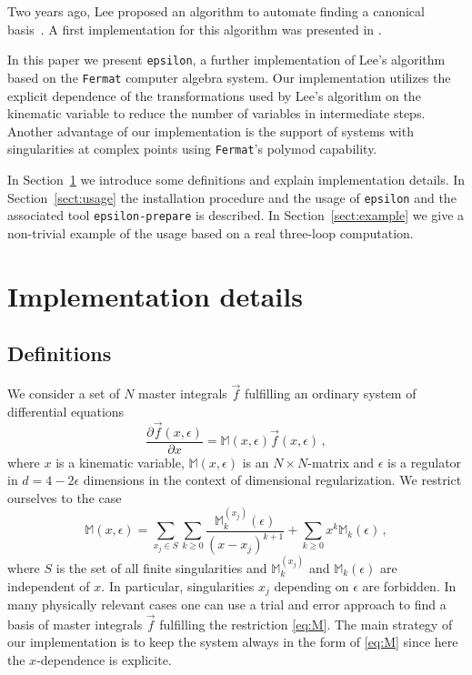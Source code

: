 \documentclass[12pt]{article}
\numberwithin{equation}{section}
\numberwithin{figure}{section}
\newcommand{\M}{\mathds{M}}
\begin{document}
    Two years ago, Lee proposed an algorithm to automate finding a canonical basis~\cite{Lee:2014ioa}.
    A first implementation for this algorithm was presented in \cite{Gituliar:2016vfa}.

    In this paper we present \texttt{epsilon}, a further implementation of Lee's algorithm based on the \texttt{Fermat}\cite{Lewis:fermat} computer algebra system.
    Our implementation utilizes the explicit dependence of the transformations used by Lee's algorithm on the kinematic variable to reduce the number of variables in intermediate steps.
    Another advantage of our implementation is the support of systems with singularities at complex points using \texttt{Fermat}'s polymod capability.

    In Section~\ref{sect:impl} we introduce some definitions and explain implementation details.
    In Section~\ref{sect:usage} the installation procedure and the usage of \texttt{epsilon} and the associated tool \texttt{epsilon-prepare} is described.
    In Section~\ref{sect:example} we give a non-trivial example of the usage based on a real three-loop computation.
  \section{Implementation details} \label{sect:impl}
    \subsection{Definitions}
      We consider a set of $N$ master integrals $\vec{f}$ fulfilling an ordinary system of differential equations
      \begin{equation} \label{eq:system}
        \frac{\partial \vec{f}(x,\epsilon)}{\partial x} 
        = 
        \M(x,\epsilon) \vec{f}(x,\epsilon)\,,
      \end{equation}
      where $x$ is a kinematic variable, $\M(x,\epsilon)$ is an $N\times N$-matrix and $\epsilon$ is a regulator in $d = 4-2\epsilon$ dimensions in the context of dimensional regularization.
      We restrict ourselves to the case
      \begin{equation} \label{eq:M}
        \M(x,\epsilon) 
        = 
        \sum\limits_{x_j \in S} 
        \sum\limits_{k\geq0} 
        \frac{\M^{(x_j)}_k(\epsilon)}{(x-x_j)^{k+1}} 
        + 
        \sum\limits_{k\geq 0} 
        x^k 
        \M_k(\epsilon)\,,
      \end{equation}
      where $S$ is the set of all finite singularities and $\M^{(x_j)}_k$ and $\M_k(\epsilon)$ are independent of $x$.
      In particular, singularities $x_j$ depending on $\epsilon$ are forbidden.
      In many physically relevant cases one can use a trial and error approach to find a basis of master integrals $\vec{f}$ fulfilling the restriction \eqref{eq:M}.
      The main strategy of our implementation is to keep the system always in the form of \eqref{eq:M} since here the $x$-dependence is explicite.
\end{document}
